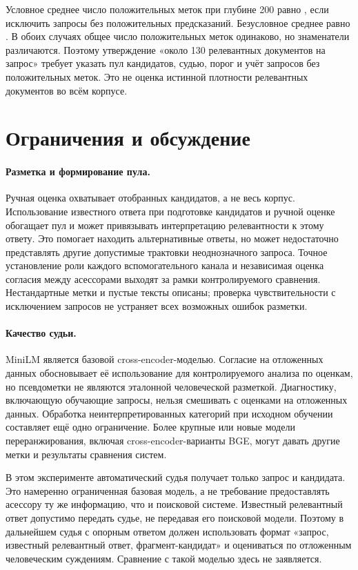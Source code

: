 \documentclass[runningheads,a4paper]{llncs}
\begin{document}
Условное среднее число положительных меток при глубине 200 равно \FullPositiveLargeConditional{}, если исключить запросы без положительных предсказаний. Безусловное среднее равно \FullPositiveLarge{}. В обоих случаях общее число положительных меток одинаково, но знаменатели различаются. Поэтому утверждение «около 130 релевантных документов на запрос» требует указать пул кандидатов, судью, порог и учёт запросов без положительных меток. Это не оценка истинной плотности релевантных документов во всём корпусе.

\section{Ограничения и обсуждение}
\label{sec:discussion}

\paragraph{Разметка и формирование пула.}
Ручная оценка охватывает отобранных кандидатов, а не весь корпус. Использование известного ответа при подготовке кандидатов и ручной оценке обогащает пул и может привязывать интерпретацию релевантности к этому ответу. Это помогает находить альтернативные ответы, но может недостаточно представлять другие допустимые трактовки неоднозначного запроса. Точное установление роли каждого вспомогательного канала и независимая оценка согласия между асессорами выходят за рамки контролируемого сравнения. Нестандартные метки и пустые тексты описаны; проверка чувствительности с исключением запросов не устраняет всех возможных ошибок разметки.

\paragraph{Качество судьи.}
MiniLM является базовой cross-encoder-моделью. Согласие на отложенных данных обосновывает её использование для контролируемого анализа по оценкам, но псевдометки не являются эталонной человеческой разметкой. Диагностику, включающую обучающие запросы, нельзя смешивать с оценками на отложенных данных. Обработка неинтерпретированных категорий при исходном обучении составляет ещё одно ограничение. Более крупные или новые модели переранжирования, включая cross-encoder-варианты BGE, могут давать другие метки и результаты сравнения систем.

В этом эксперименте автоматический судья получает только запрос и кандидата. Это намеренно ограниченная базовая модель, а не требование предоставлять асессору ту же информацию, что и поисковой системе. Известный релевантный ответ допустимо передать судье, не передавая его поисковой модели. Поэтому в дальнейшем судья с опорным ответом должен использовать формат «запрос, известный релевантный ответ, фрагмент-кандидат» и оцениваться по отложенным человеческим суждениям. Сравнение с такой моделью здесь не заявляется.
\end{document}
